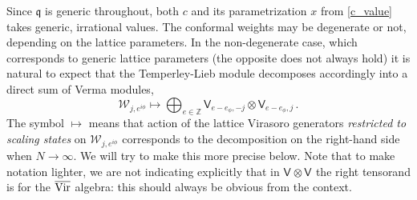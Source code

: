 \documentclass[a4paper,10pt]{article}
\newcommand{\q}{\mathfrak{q}}
\newcommand{\linnea}[1]{$\framebox{\tiny L}$\ \textbf{\texttt{{\color{red}\footnotesize#1}}}}
\newcommand{\aSt}{\mathcal{W}}
\newcommand{\AStTL}[2]{\aSt_{#1,#2}}
\newcommand{\Verma}[1]{\mathsf{V}_{#1}}
\newcommand{\Vir}{\hbox{Vir}}
\begin{document}
Since $\q$ is generic throughout, both $c$ and its parametrization $x$ from \eqref{c_value} takes generic, irrational values.
The conformal weights may be degenerate or not, depending on the lattice parameters. In the non-degenerate case, which corresponds to generic lattice parameters (the opposite does not always hold) it is natural to expect that the Temperley-Lieb module decomposes accordingly into a direct sum of Verma modules,
%
%
\begin{equation}\label{identcontl}
\AStTL{j}{e^{i\phi}}\mapsto \bigoplus_{e\in\mathbb{Z}} \Verma{e-e_\phi,-j}\otimes\Verma{e-e_\phi,j} \,. 
\end{equation}
%
The symbol $\mapsto$ means that action of the lattice Virasoro generators {\sl restricted to scaling states} on $\AStTL{j}{e^{i\phi}}$ corresponds to the decomposition on the right-hand side when $N\to\infty$. We will try to make this more precise below.
Note that to make notation lighter, we are not indicating explicitly that in $\Verma{}\otimes\Verma{}$ the right tensorand is for the $\overline{\Vir}$ algebra: this should always be obvious from the context. 
\end{document}
